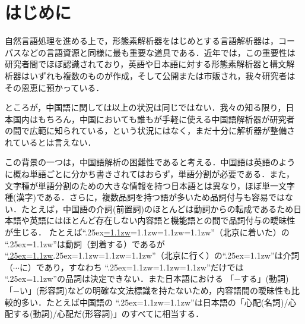 

\maketitle
\thispagestyle{empty}


\section{はじめに}
自然言語処理を進める上で，形態素解析器をはじめとする言語解析器は，コー
パスなどの言語資源と同様に最も重要な道具である．近年では，この重要性は
研究者間でほぼ認識されており，英語や日本語に対する形態素解析器と構文解
析器はいずれも複数のものが作成，そして公開または市販され，我々研究者は
その恩恵に預かっている．

ところが，中国語に関しては以上の状況は同じではない．我々の知る限り，日
本国内はもちろん，中国においても誰もが手軽に使える中国語解析器が研究者
の間で広範に知られている，という状況にはなく，まだ十分に解析器が整備さ
れているとは言えない．

この背景の一つは，中国語解析の困難性であると考える．中国語は英語のよう
に概ね単語ごとに分かち書きされてはおらず，単語分割が必要である．また，
文字種が単語分割のための大きな情報を持つ日本語とは異なり，ほぼ単一文字
種(漢字)である．さらに，複数品詞を持つ語が多いため品詞付与も容易ではな
い．たとえば，中国語の介詞(前置詞)のほとんどは動詞からの転成であるため日
本語や英語にはほとんど存在しない内容語と機能語との間で品詞付与の曖昧性
が生じる．
たとえば``\lower.25ex\hbox{\underline{\epsfxsize=1.1zw}\epsfxsize=1.1zw\epsfxsize=1.1zw\epsfxsize=1.1zw}''（北京に着いた）の
``\lower.25ex\hbox{\epsfxsize=1.1zw}''は動詞（到着する）であるが
``\underline{\lower.25ex\hbox{\epsfxsize=1.1zw}}\lower.25ex\hbox{\epsfxsize=1.1zw\epsfxsize=1.1zw\epsfxsize=1.1zw}''（北京に行く）の``\lower.25ex\hbox{\epsfxsize=1.1zw}''は介詞（$\cdots$に）であり，すなわち
``\lower.25ex\hbox{\epsfxsize=1.1zw\epsfxsize=1.1zw\epsfxsize=1.1zw}''だけでは
``\lower.25ex\hbox{\epsfxsize=1.1zw}''の品詞は決定できない．また日本語における
「−する」(動詞)「−い」(形容詞)などの明確な文法標識を持たないため，内容語間の曖昧性も比較的多い．たとえば中国語の
``\lower.25ex\hbox{\epsfxsize=1.1zw\epsfxsize=1.1zw}''は日本語の「心配(名詞)/心配する(動詞)/心配だ(形容詞)」のすべてに相当する．

